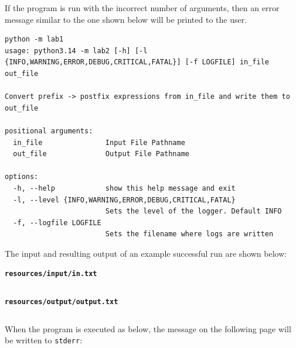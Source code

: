 \documentclass[10pt,letterpaper,final]{report}
\begin{document}
\noindent If the program is run with the incorrect number of arguments, then an error message similar to the one shown below will be printed to the user.

\begin{verbatim}
python -m lab1
usage: python3.14 -m lab2 [-h] [-l {INFO,WARNING,ERROR,DEBUG,CRITICAL,FATAL}] [-f LOGFILE] in_file out_file

Convert prefix -> postfix expressions from in_file and write them to out_file

positional arguments:
  in_file               Input File Pathname
  out_file              Output File Pathname

options:
  -h, --help            show this help message and exit
  -l, --level {INFO,WARNING,ERROR,DEBUG,CRITICAL,FATAL}
                        Sets the level of the logger. Default INFO
  -f, --logfile LOGFILE
                        Sets the filename where logs are written
\end{verbatim}

\noindent The input and resulting output of an example successful run are shown below:

\begin{center}
  \begin{minipage}[t]{0.2\textwidth}
    \centering
    \textbf{\texttt{resources/input/in.txt}}\\
    \inputminted[frame=single,fontsize=\footnotesize]{text}{resources/input/in.txt}
  \end{minipage}\hfill
  \begin{minipage}[t]{0.76\textwidth}
    \centering
    \textbf{\texttt{resources/output/output.txt}}\\
    \inputminted[breaklines, breakanywhere, fontsize=\footnotesize, frame=single, fontsize=\footnotesize]{text}{resources/output/output.txt}
  \end{minipage}
\end{center}

\noindent When the program is executed as below, the message on the following page will be written to \texttt{stderr}:

\pagebreak
\end{document}
